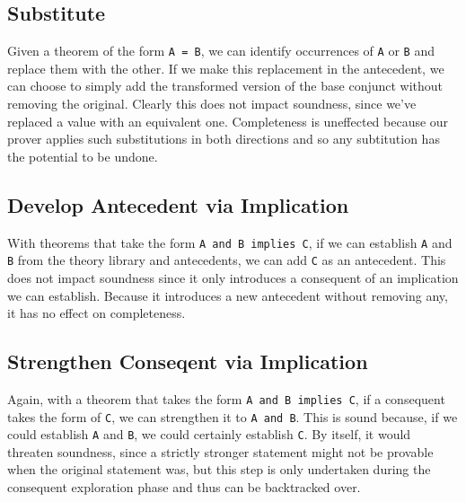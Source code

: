	\subsection{Substitute}
Given a theorem of the form \texttt{A~=~B}, we can identify occurrences of \texttt{A} or \texttt{B} and replace them with the other.  If we make this replacement in the antecedent, we can choose to simply add the transformed version of the base conjunct without removing the original.  Clearly this does not impact soundness, since we've replaced a value with an equivalent one.  Completeness is uneffected because our prover applies such substitutions in both directions and so any subtitution has the potential to be undone.

	\subsection{Develop Antecedent via Implication}
With theorems that take the form \texttt{A~and~B~implies~C}, if we can establish \texttt{A} and \texttt{B} from the theory library and antecedents, we can add \texttt{C} as an antecedent.  This does not impact soundness since it only introduces a consequent of an implication we can establish.  Because it introduces a new antecedent without removing any, it has no effect on completeness.

	\subsection{Strengthen Conseqent via Implication}
Again, with a theorem that takes the form \texttt{A~and~B~implies~C}, if a consequent takes the form of \texttt{C}, we can strengthen it to \texttt{A~and~B}.  This is sound because, if we could establish \texttt{A} and \texttt{B}, we could certainly establish \texttt{C}.  By itself, it would threaten soundness, since a strictly stronger statement might not be provable when the original statement was, but this step is only undertaken during the consequent exploration phase and thus can be backtracked over.

